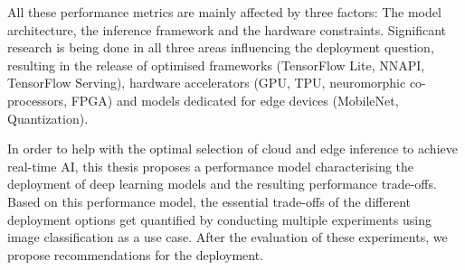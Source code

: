 All these performance metrics are mainly affected by three factors: The model architecture, the inference framework and the hardware constraints.
Significant research is being done in all three areas influencing the deployment question, resulting in the release of optimised frameworks (TensorFlow Lite, NNAPI, TensorFlow Serving), hardware accelerators (GPU, TPU, neuromorphic co-processors, FPGA) and models dedicated for edge devices (MobileNet, Quantization).


In order to help with the optimal selection of cloud and edge inference to achieve real-time AI, this thesis proposes a performance model characterising the deployment of deep learning models and the resulting performance trade-offs.
Based on this performance model, the essential trade-offs of the different deployment options get quantified by conducting multiple experiments using image classification as a use case. After the evaluation of these experiments, we propose recommendations for the deployment.



